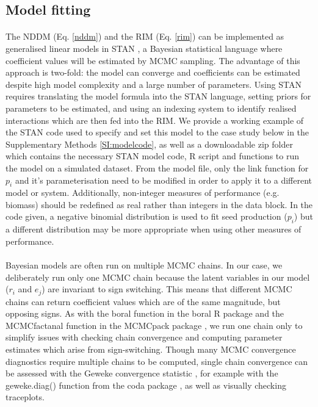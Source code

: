 \documentclass[a4,12pt]{article}
\begin{document}
    \subsection{Model fitting}

        \paragraph{}        
        The NDDM (Eq. \ref{nddm}) and the RIM (Eq. \ref{rim}) can be implemented as generalised linear models in STAN \parencite{Carpenter2017}, a Bayesian statistical language where coefficient values will be estimated by MCMC sampling. The advantage of this approach is two-fold: the model can converge and coefficients can be estimated despite high model complexity and a large number of parameters. Using STAN requires translating the model formula into the STAN language, setting priors for parameters to be estimated, and using an indexing system to identify realised interactions which are then fed into the RIM. We provide a working example of the STAN code used to specify and set this model to the case study below in the Supplementary Methods \ref{SI:modelcode}, as well as a downloadable zip folder which contains the necessary STAN model code, R script and functions to run the model on a simulated dataset. From the model file, only the link function for $p_i$ and it's parameterisation need to be modified in order to apply it to a different model or system. Additionally, non-integer measures of performance (e.g. biomass) should be redefined as real rather than integers in the data block. In the code given, a negative binomial distribution is used to fit seed production ($p_i$) but a different distribution may be more appropriate when using other measures of performance.   

        \paragraph{}
        Bayesian models are often run on multiple MCMC chains. In our case, we deliberately run only one MCMC chain because the latent variables in our model ($r_i$ and $e_j$) are invariant to sign switching. This means that different MCMC chains can return coefficient values which are of the same magnitude, but opposing signs. As with the boral function in the boral R package \parencite{Hui2021} and the MCMCfactanal function in the MCMCpack package \parencite{Martin2011}, we run one chain only to simplify issues with checking chain convergence and computing parameter estimates which arise from sign-switching. Though many MCMC convergence diagnostics require multiple chains to be computed, single chain convergence can be assessed with the Geweke convergence statistic \parencite{Geweke1992}, for example with the geweke.diag() function from the coda package \parencite{Plummer2006}, as well as visually checking traceplots.
\end{document}
